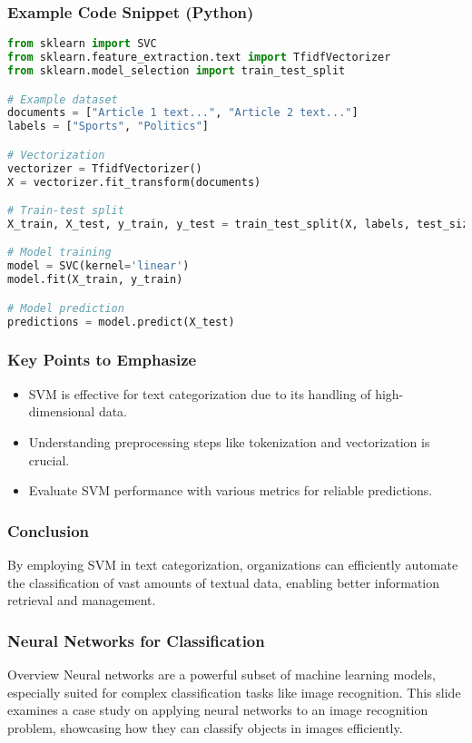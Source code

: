 \documentclass{beamer}
\begin{document}
\begin{frame}[fragile]
    \frametitle{Example Code Snippet (Python)}
    \begin{lstlisting}[language=Python]
from sklearn import SVC
from sklearn.feature_extraction.text import TfidfVectorizer
from sklearn.model_selection import train_test_split

# Example dataset
documents = ["Article 1 text...", "Article 2 text..."]
labels = ["Sports", "Politics"]

# Vectorization
vectorizer = TfidfVectorizer()
X = vectorizer.fit_transform(documents)

# Train-test split
X_train, X_test, y_train, y_test = train_test_split(X, labels, test_size=0.25)

# Model training
model = SVC(kernel='linear')
model.fit(X_train, y_train)

# Model prediction
predictions = model.predict(X_test)
    \end{lstlisting}
\end{frame}

\begin{frame}[fragile]
    \frametitle{Key Points to Emphasize}
    \begin{itemize}
        \item SVM is effective for text categorization due to its handling of high-dimensional data.
        \item Understanding preprocessing steps like tokenization and vectorization is crucial.
        \item Evaluate SVM performance with various metrics for reliable predictions.
    \end{itemize}
\end{frame}

\begin{frame}[fragile]
    \frametitle{Conclusion}
    By employing SVM in text categorization, organizations can efficiently automate the classification of vast amounts of textual data, enabling better information retrieval and management.
\end{frame}

\begin{frame}[fragile]
    \frametitle{Neural Networks for Classification}
    \begin{block}{Overview}
        Neural networks are a powerful subset of machine learning models, especially suited for complex classification tasks like image recognition.
        This slide examines a case study on applying neural networks to an image recognition problem, showcasing how they can classify objects in images efficiently.
    \end{block}
\end{frame}
\end{document}
